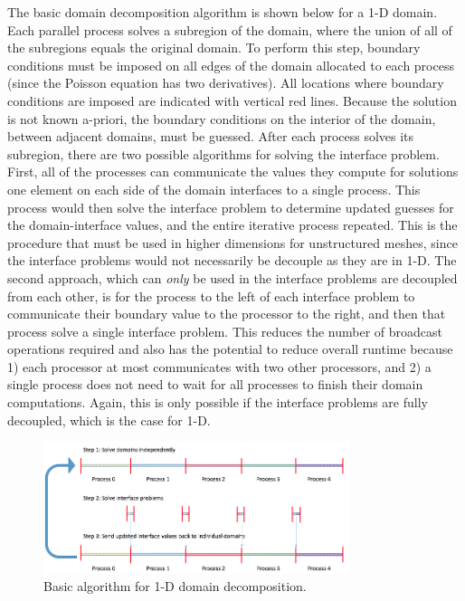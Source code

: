 \documentclass[10pt]{article}
\begin{document}
The basic domain decomposition algorithm is shown below for a 1-D domain. Each parallel process solves a subregion of the domain, where the union of all of the subregions equals the original domain. To perform this step, boundary conditions must be imposed on all edges of the domain allocated to each process (since the Poisson equation has two derivatives). All locations where boundary conditions are imposed are indicated with vertical red lines. Because the solution is not known a-priori, the boundary conditions on the interior of the domain, between adjacent domains, must be guessed. After each process solves its subregion, there are two possible algorithms for solving the interface problem. First, all of the processes can communicate the values they compute for solutions one element on each side of the domain interfaces to a single process. This process would then solve the interface problem to determine updated guesses for the domain-interface values, and the entire iterative process repeated. This is the procedure that must be used in higher dimensions for unstructured meshes, since the interface problems would not necessarily be decouple as they are in 1-D. The second approach, which can {\it only} be used in the interface problems are decoupled from each other, is for the process to the left of each interface problem to communicate their boundary value to the processor to the right, and then that process solve a single interface problem. This reduces the number of broadcast operations required and also has the potential to reduce overall runtime because 1) each processor at most communicates with two other processors, and 2) a single process does not need to wait for all processes to finish their domain computations. Again, this is only possible if the interface problems are fully decoupled, which is the case for 1-D.

\begin{figure}[H]
\centering
\includegraphics[width=0.8\textwidth]{../figures/1D-dd.png}
\caption{Basic algorithm for 1-D domain decomposition.}
\end{figure}
\end{document}
